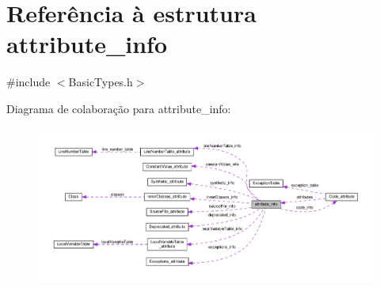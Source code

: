 \hypertarget{structattribute__info}{}\section{Referência à estrutura attribute\+\_\+info}
\label{structattribute__info}


{\ttfamily \#include $<$Basic\+Types.\+h$>$}



Diagrama de colaboração para attribute\+\_\+info\+:
\nopagebreak
\begin{figure}[H]
\begin{center}
\leavevmode
\includegraphics[width=350pt]{structattribute__info__coll__graph}
\end{center}
\end{figure}
